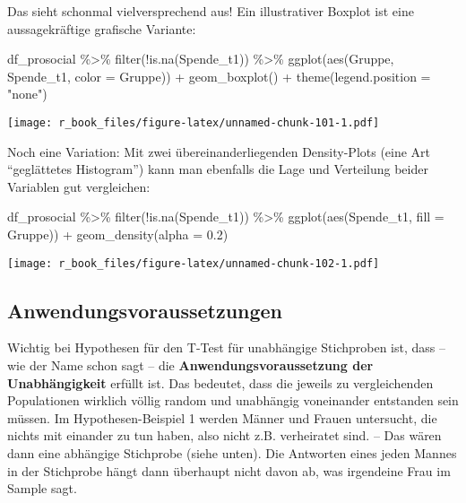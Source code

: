 \documentclass[
]{book}
\newenvironment{Shaded}{\begin{snugshade}}{\end{snugshade}}
\newcommand{\AttributeTok}[1]{\textcolor[rgb]{0.77,0.63,0.00}{#1}}
\newcommand{\FloatTok}[1]{\textcolor[rgb]{0.00,0.00,0.81}{#1}}
\newcommand{\FunctionTok}[1]{\textcolor[rgb]{0.00,0.00,0.00}{#1}}
\newcommand{\NormalTok}[1]{#1}
\newcommand{\SpecialCharTok}[1]{\textcolor[rgb]{0.00,0.00,0.00}{#1}}
\newcommand{\StringTok}[1]{\textcolor[rgb]{0.31,0.60,0.02}{#1}}
\begin{document}
Das sieht schonmal vielversprechend aus! Ein illustrativer Boxplot ist eine aussagekräftige grafische Variante:

\begin{Shaded}
\begin{Highlighting}[]
\NormalTok{df\_prosocial }\SpecialCharTok{\%\textgreater{}\%} 
  \FunctionTok{filter}\NormalTok{(}\SpecialCharTok{!}\FunctionTok{is.na}\NormalTok{(Spende\_t1)) }\SpecialCharTok{\%\textgreater{}\%} 
  \FunctionTok{ggplot}\NormalTok{(}\FunctionTok{aes}\NormalTok{(Gruppe, Spende\_t1, }\AttributeTok{color =}\NormalTok{ Gruppe)) }\SpecialCharTok{+}
  \FunctionTok{geom\_boxplot}\NormalTok{() }\SpecialCharTok{+}
  \FunctionTok{theme}\NormalTok{(}\AttributeTok{legend.position =} \StringTok{"none"}\NormalTok{)}
\end{Highlighting}
\end{Shaded}

\texttt{[image: r\_book\_files/figure-latex/unnamed-chunk-101-1.pdf]}

Noch eine Variation: Mit zwei übereinanderliegenden Density-Plots (eine Art ``geglättetes Histogram'') kann man ebenfalls die Lage und Verteilung beider Variablen gut vergleichen:

\begin{Shaded}
\begin{Highlighting}[]
\NormalTok{df\_prosocial }\SpecialCharTok{\%\textgreater{}\%} 
  \FunctionTok{filter}\NormalTok{(}\SpecialCharTok{!}\FunctionTok{is.na}\NormalTok{(Spende\_t1)) }\SpecialCharTok{\%\textgreater{}\%} 
  \FunctionTok{ggplot}\NormalTok{(}\FunctionTok{aes}\NormalTok{(Spende\_t1, }\AttributeTok{fill =}\NormalTok{ Gruppe)) }\SpecialCharTok{+} 
  \FunctionTok{geom\_density}\NormalTok{(}\AttributeTok{alpha =} \FloatTok{0.2}\NormalTok{)}
\end{Highlighting}
\end{Shaded}

\texttt{[image: r\_book\_files/figure-latex/unnamed-chunk-102-1.pdf]}

\hypertarget{anwendungsvoraussetzungen}{%
\subsection{Anwendungsvoraussetzungen}\label{anwendungsvoraussetzungen}}

Wichtig bei Hypothesen für den T-Test für unabhängige Stichproben ist, dass -- wie der Name schon sagt -- die \textbf{Anwendungsvoraussetzung der Unabhängigkeit} erfüllt ist. Das bedeutet, dass die jeweils zu vergleichenden Populationen wirklich völlig random und unabhängig voneinander entstanden sein müssen. Im Hypothesen-Beispiel 1 werden Männer und Frauen untersucht, die nichts mit einander zu tun haben, also nicht z.B. verheiratet sind. -- Das wären dann eine abhängige Stichprobe (siehe unten). Die Antworten eines jeden Mannes in der Stichprobe hängt dann überhaupt nicht davon ab, was irgendeine Frau im Sample sagt.
\end{document}
